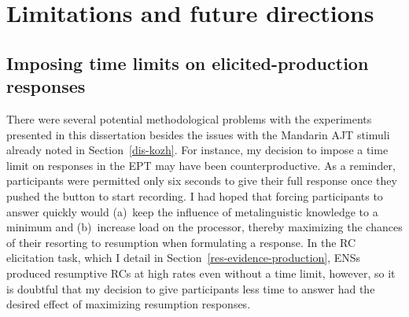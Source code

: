 \section{Limitations and future directions}\label{dis-limitation}

\subsection{Imposing time limits on elicited-production responses}\label{dis-limitation-ept}

There were several potential methodological problems with the experiments presented in this dissertation besides the issues with the Mandarin AJT stimuli already noted in Section~\ref{dis-kozh}. For instance, my decision to impose a time limit on responses in the EPT may have been counterproductive. As a reminder, participants were permitted only six seconds to give their full response once they pushed the button to start recording.\footnotemark{} I had hoped that forcing participants to answer quickly would (a)~keep the influence of metalinguistic knowledge to a minimum and (b)~increase load on the processor, thereby maximizing the chances of their resorting to resumption when formulating a response. In the \textcite{ferreira.swets2005} RC elicitation task, which I detail in Section~\ref{res-evidence-production}, ENSs produced resumptive RCs at high rates even without a time limit, however, so it is doubtful that my decision to give participants less time to answer had the desired effect of maximizing resumption responses. 


